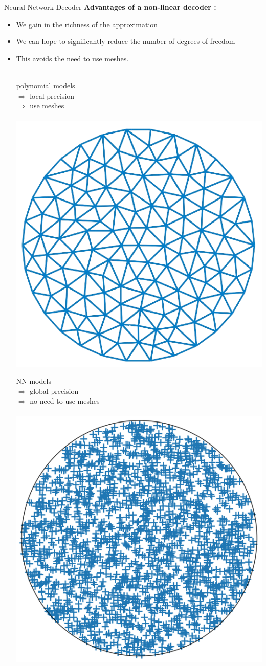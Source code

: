\begin{frame}{Neural Network Decoder}
	\textbf{Advantages of a non-linear decoder :}
	\begin{itemize}[\textbullet]
		\item We gain in the richness of the approximation
		\item We can hope to significantly reduce the number of degrees of freedom
		\item This avoids the need to use meshes. \\ \; \\
		
		\begin{center}
			\begin{minipage}{0.4\linewidth}
				polynomial models \\
				$\Rightarrow$ local precision \\
				$\Rightarrow$ use meshes \\ \; \\
				\centering
				\includegraphics[width=0.6\linewidth]{images/pinns/nonlineardecoder_mesh.png}
			\end{minipage} \quad \vline \quad
			\begin{minipage}{0.4\linewidth}
				NN models \\
				$\Rightarrow$ global precision \\
				$\Rightarrow$ no need to use meshes \\ \; \\
				\centering
				\includegraphics[width=0.6\linewidth]{images/pinns/nonlineardecoder_random.png}

\end{minipage}
\end{center}
\end{itemize}
\end{frame}
